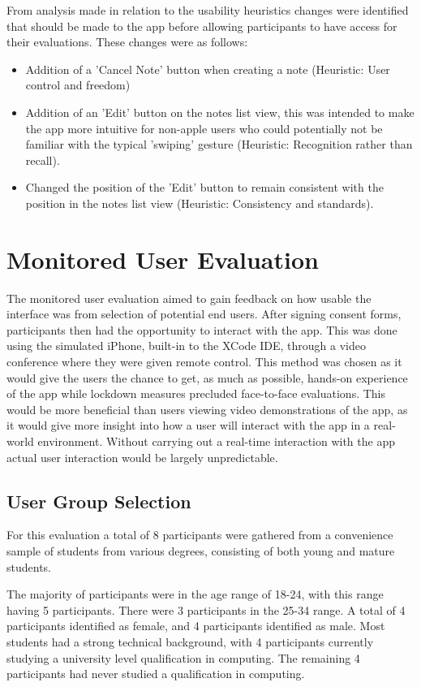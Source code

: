 \documentclass{l4proj}
\begin{document}
From analysis made in relation to the usability heuristics changes were identified that should be made to the app before allowing participants to have access for their evaluations. These changes were as follows:
\begin{itemize}
    \item Addition of a 'Cancel Note' button when creating a note (Heuristic: User control and freedom)
    \item Addition of an 'Edit' button on the notes list view, this was intended to make the app more intuitive for non-apple users who could potentially not be familiar with the typical 'swiping' gesture (Heuristic: Recognition rather than recall).
    \item Changed the position of the 'Edit' button to remain consistent with the position in the notes list view (Heuristic: Consistency and standards).
\end{itemize}


\section{Monitored User Evaluation}

The monitored user evaluation aimed to gain feedback on how usable the interface was from selection of potential end users. After signing consent forms, participants then had the opportunity to interact with the app. This was done using the simulated iPhone, built-in to the XCode IDE, through a video conference where they were given remote control. This method was chosen as it would give the users the chance to get, as much as possible, hands-on experience of the app while lockdown measures precluded face-to-face evaluations. This would be more beneficial than users viewing video demonstrations of the app, as it would give more insight into how a user will interact with the app in a real-world environment. Without carrying out a real-time interaction with the app actual user interaction would be largely unpredictable.

\subsection{User Group Selection}

For this evaluation a total of 8 participants were gathered from a convenience sample of students from various degrees, consisting of both young and mature students. 

The majority of participants were in the age range of 18-24, with this range having 5 participants. There were 3 participants in the 25-34 range. A total of 4 participants identified as female, and 4 participants identified as male. Most students had a strong technical background, with 4 participants currently studying a university level qualification in computing. The remaining 4 participants had never studied a qualification in computing.
\end{document}

